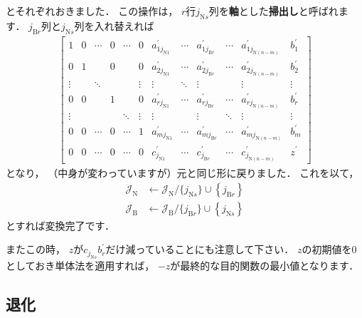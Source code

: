 ﻿\documentclass[a4paper]{jsarticle}
\begin{document}
とそれぞれおきました．
この操作は，
$r$行$j_{\mathrm{N}s}$列を{\bf 軸}とした{\bf 掃出し}と呼ばれます．
$j_{\mathrm{B}r}$列と$j_{\mathrm{N}s}$列を入れ替えれば
\begin{align*}
\left[\begin{array}{cccccc|ccccc|c}
 1 & 0 & \cdots & 0 & \cdots & 0 & a_{1j_{\mathrm{N}1}}^{\prime} & \cdots & a_{1j_{\mathrm{B}r}}^{\prime} & \cdots & a_{1j_{\mathrm{N}(n-m)}}^{\prime} & b_{1}^{\prime} \\
 0 & 1 &        & 0 &        & 0 & a_{2j_{\mathrm{N}1}}^{\prime} & \cdots & a_{2j_{\mathrm{B}r}}^{\prime} & \cdots & a_{2j_{\mathrm{N}(n-m)}}^{\prime} & b_{2}^{\prime} \\
\vdots & & \ddots & & & \vdots & \vdots & \ddots &  \vdots & &  \vdots & \vdots \\
 0 & 0 &        & 1 & & 0 & a_{rj_{\mathrm{N}1}}^{\prime} & \cdots & a_{rj_{\mathrm{B}r}}^{\prime} & \cdots & a_{rj_{\mathrm{N}(n-m)}}^{\prime} & b_{r}^{\prime} \\
\vdots & & & & \ddots & \vdots & \vdots & &  \vdots & \ddots &  \vdots & \vdots \\
 0 & 0 & \cdots & 0 & \cdots & 1 & a_{mj_{\mathrm{N}1}}^{\prime} & \cdots & a_{mj_{\mathrm{B}r}}^{\prime} & \cdots & a_{mj_{\mathrm{N}(n-m)}}^{\prime} & b_{m}^{\prime} \\
\hline
 0 & 0 & \cdots & 0 & \cdots & 0 & c_{j_{\mathrm{N}1}}^{\prime} & \cdots & c_{j_{\mathrm{B}r}}^{\prime} & \cdots & c_{j_{\mathrm{N}(n-m)}}^{\prime} & z^{\prime}
\end{array}
\right]
\end{align*}
となり，
（中身が変わっていますが）元と同じ形に戻りました．
これを以て，
\begin{align*}
\mathcal{J}_{\mathrm{N}}&\leftarrow
\mathcal{J}_{\mathrm{N}}/\{j_{\mathrm{N}s}\}\cup\left\{j_{\mathrm{B}r}\right\}
\\
\mathcal{J}_{\mathrm{B}}&\leftarrow
\mathcal{J}_{\mathrm{B}}/\{j_{\mathrm{B}r}\}\cup\left\{j_{\mathrm{N}s}\right\}
\end{align*}
とすれば変換完了です．

またこの時，
$z$が$c_{j_{\mathrm{N}s}}b_{r}^{\prime}$だけ減っていることにも注意して下さい．
$z$の初期値を$0$としておき単体法を適用すれば，
$-z$が最終的な目的関数の最小値となります．


\subsection{退化}
\end{document}
